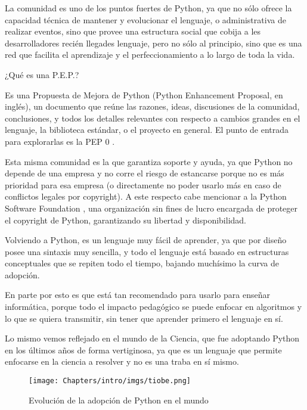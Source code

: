 La comunidad es uno de los puntos fuertes de Python, ya que no sólo ofrece la capacidad técnica de mantener y evolucionar el lenguaje, o administrativa de realizar eventos, sino que provee una estructura social que cobija a les desarrolladores recién llegades lenguaje, pero no sólo al principio, sino que es una red que facilita el aprendizaje y el perfeccionamiento a lo largo de toda la vida.

\begin{info}
¿Qué es una P.E.P.? 

Es una Propuesta de Mejora de Python (Python Enhancement Proposal, en inglés), un documento que reúne las razones, ideas, discusiones de la comunidad, conclusiones, y todos los detalles relevantes con respecto a cambios grandes en el lenguaje, la biblioteca estándar, o el proyecto en general. El punto de entrada para explorarlas es la PEP 0 \cite{pep0}.
\end{info}

Esta misma comunidad es la que garantiza soporte y ayuda, ya que Python no depende de una empresa y no corre el riesgo de estancarse porque no es más prioridad para esa empresa (o directamente no poder usarlo más en caso de conflictos legales por copyright). A este respecto cabe mencionar a la Python Software Foundation \cite{psf}, una organización sin fines de lucro encargada de proteger el copyright de Python, garantizando su libertad y disponibilidad.

Volviendo a Python, es un lenguaje muy fácil de aprender, ya que por diseño posee una sintaxis muy sencilla, y todo el lenguaje está basado en estructuras conceptuales que se repiten todo el tiempo, bajando muchísimo la curva de adopción.

En parte por esto es que está tan recomendado para usarlo para enseñar informática, porque todo el impacto pedagógico se puede enfocar en algoritmos y lo que se quiera transmitir, sin tener que aprender primero el lenguaje en sí.

Lo mismo vemos reflejado en el mundo de la Ciencia, que fue adoptando Python en los últimos años de forma vertiginosa, ya que es un lenguaje que permite enfocarse en la ciencia a resolver y no es una traba en sí mismo.

\begin{figure}
    \texttt{[image: Chapters/intro/imgs/tiobe.png]}
    \caption{Evolución de la adopción de Python en el mundo}
\end{figure}

